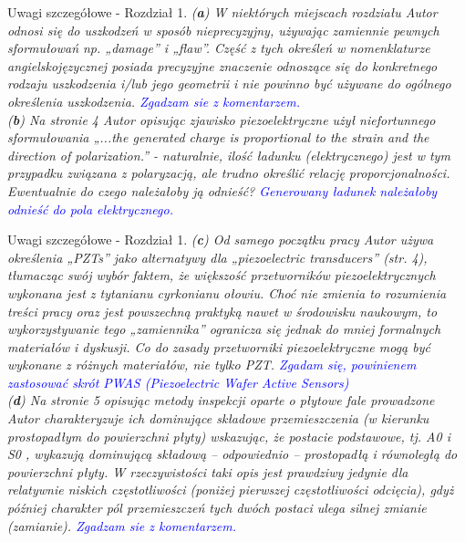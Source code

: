 \documentclass[10pt,aspectratio=169]{beamer} %
\begin{document}
\begin{frame}[label=frame40]{Uwagi szczegółowe - Rozdział 1.}\justifying
\textit{(\textbf{a}) W niektórych miejscach rozdziału Autor odnosi się do uszkodzeń w	sposób nieprecyzyjny, używając zamiennie pewnych sformułowań np. „damage” i „flaw”. Część z tych określeń w nomenklaturze angielskojęzycznej posiada precyzyjne znaczenie odnoszące się do konkretnego rodzaju uszkodzenia i/lub jego geometrii i nie powinno być używane do ogólnego określenia uszkodzenia. \textcolor{blue}{Zgadzam sie z komentarzem.}\\
(\textbf{b}) Na stronie 4 Autor opisując zjawisko piezoelektryczne użył niefortunnego	sformułowania „...the generated charge is proportional to the strain and the direction of	polarization.” - naturalnie, ilość ładunku (elektrycznego) jest w tym przypadku związana	z polaryzacją, ale trudno określić relację proporcjonalności. Ewentualnie do czego należałoby ją odnieść? \textcolor{blue}{ Generowany ładunek należałoby odnieść do pola elektrycznego.}}
\end{frame}
\begin{frame}[label=frame41]{Uwagi szczegółowe - Rozdział 1.}\justifying
\textit{(\textbf{c}) Od samego początku pracy Autor używa określenia „PZTs” jako alternatywy dla	„piezoelectric transducers” (str. 4), tłumacząc swój wybór faktem, że	większość przetworników piezoelektrycznych wykonana jest z tytanianu cyrkonianu ołowiu.	Choć nie zmienia to rozumienia treści pracy oraz jest powszechną praktyką nawet w środowisku naukowym, to wykorzystywanie tego „zamiennika” ogranicza się jednak do mniej formalnych materiałów i dyskusji. Co do zasady przetworniki piezoelektryczne mogą być wykonane z różnych materiałów, nie tylko PZT.  \textcolor{blue}{Zgadam się, powinienem zastosować skrót PWAS (Piezoelectric Wafer Active Sensors)}\\
(\textbf{d}) Na stronie 5 opisując metody inspekcji oparte o płytowe fale prowadzone Autor charakteryzuje ich dominujące składowe przemieszczenia (w kierunku prostopadłym do powierzchni płyty) wskazując, że postacie podstawowe, tj. A0 i S0 , wykazują dominującą składową – odpowiednio – prostopadłą i równoległą do powierzchni płyty.	W rzeczywistości taki opis jest prawdziwy jedynie dla relatywnie niskich częstotliwości (poniżej pierwszej częstotliwości odcięcia), gdyż później charakter pól przemieszczeń tych dwóch postaci ulega silnej zmianie (zamianie). \textcolor{blue}{Zgadzam sie z komentarzem.}}
\end{frame}
\end{document}
